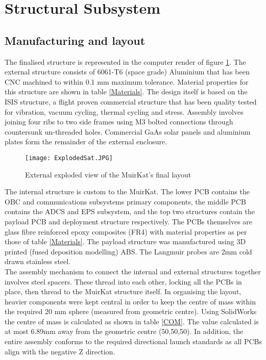 \section{Structural Subsystem \label{structural}}

\subsection{Manufacturing and layout}
The finalised structure is represented in the computer render of figure \ref{ExplodedSat}. The external structure consists of 6061-T6 (space grade) Aluminium that has been CNC machined to within 0.1 mm maximum tolerance. Material properties for this structure are shown in table \ref{Materials}. The design itself is based on the ISIS structure, a flight proven commercial structure that has been quality tested for vibration, vacuum cycling, thermal cycling and stress. Assembly involves joining four ribs to two side frames using M3 bolted connections through countersunk un-threaded holes. Commercial GaAs solar panels and aluminium plates form the remainder of the external enclosure. \\
  
\begin{figure}[!h]
\centering	
\texttt{[image: ExplodedSat.JPG]}
\caption{External exploded view of the MuirKat's final layout}
\label{ExplodedSat}
\end{figure}

The internal structure is custom to the MuirKat. The lower PCB contains the OBC and communications subsystems primary components, the middle PCB contains the ADCS and EPS subsystem, and the top two structures contain the payload PCB and deployment structure respectively. The PCBs themselves are glass fibre reinforced epoxy composites (FR4) with material properties as per those of table \ref{Materials}. The payload structure was manufactured using 3D printed (fused deposition modelling) ABS. The Langmuir probes are 2mm cold drawn stainless steel. \\ 

The assembly mechanism to connect the internal and external structures together involves steel spacers. These thread into each other, locking all the PCBs in place, then thread to the MuirKat structure itself. In organising the layout, heavier components were kept central in order to keep the centre of mass within the required 20 mm sphere (measured from geometric centre). Using SolidWorks the centre of mass is calculated as shown in table \ref{COM}. The value calculated is at most 6.89mm away from the geometric centre (50,50,50). In addition, the entire assembly conforms to the required directional launch standards as all PCBs align with the negative Z direction. 
  
